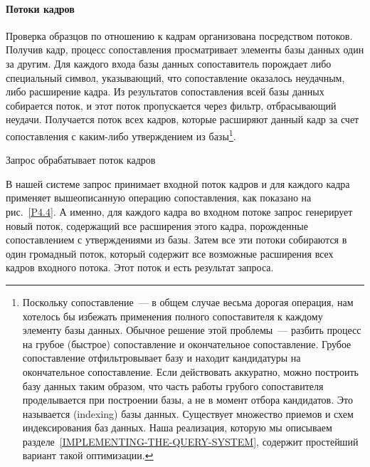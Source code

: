\paragraph{Потоки кадров}

Проверка образцов по отношению к кадрам организована
посредством потоков.  Получив кадр, процесс сопоставления просматривает
элементы базы данных один за другим.  Для каждого входа базы данных
сопоставитель порождает либо специальный символ, указывающий,
что сопоставление оказалось неудачным, либо расширение кадра.
Из результатов сопоставления всей базы данных собирается поток, и
этот поток пропускается через фильтр, отбрасывающий неудачи.  Получается
поток всех кадров, которые расширяют данный кадр за счет сопоставления с
каким-либо утверждением из
базы\footnote{Поскольку сопоставление~--- в общем случае весьма дорогая
операция, нам хотелось бы избежать применения полного сопоставителя к
каждому элементу базы данных.  Обычное решение этой проблемы~--- разбить
процесс на грубое (быстрое) сопоставление и окончательное
сопоставление.  Грубое сопоставление отфильтровывает базу и находит
кандидатуры на окончательное сопоставление.  Если действовать
аккуратно, можно построить базу данных таким образом, что часть работы
грубого сопоставителя проделывается при построении базы, а не в момент
отбора кандидатов.  Это называется 
 (indexing) базы данных.
Существует множество приемов и схем индексирования баз данных.  Наша
реализация, которую мы описываем 
разделе~\ref{IMPLEMENTING-THE-QUERY-SYSTEM}, содержит
простейший вариант такой оптимизации.}.


\begin{cntrfig}

\caption{Запрос обрабатывает поток кадров}
\label{P4.4}%
\end{cntrfig}

В нашей системе запрос принимает входной поток кадров и
для каждого кадра применяет вышеописанную операцию сопоставления, как
показано на рис.~\ref{P4.4}.  А именно, для каждого кадра
во входном потоке запрос генерирует новый поток, содержащий все
расширения этого кадра, порожденные сопоставлением с утверждениями из
базы.  Затем все эти потоки собираются в один громадный поток, который
содержит все возможные расширения всех кадров входного потока.  Этот
поток и есть результат запроса.

